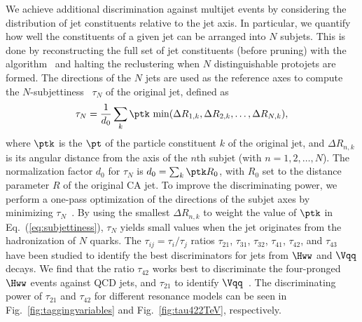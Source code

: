 We achieve additional discrimination against multijet events by
considering the distribution of jet constituents relative to the jet
axis. In particular, we quantify how well the constituents of a given
jet can be arranged into $N$ subjets. This is done by reconstructing
the full set of jet constituents (before pruning) with the \kt
algorithm~\cite{ktalg} and halting the reclustering when $N$
distinguishable protojets are formed.  
The directions of the $N$ jets are used as the reference axes to
compute the
$N$-subjettiness~\cite{Thaler:2010tr,Thaler:2011gf,Stewart:2010tn}
$\tau_{N}$ of the original jet, defined as
\begin{equation}
\label{eq:subjettiness}
\tau_N = \frac{1}{d_{0}} \sum_{k} \ptk\,\min( \Delta R_{1,k}, \Delta R_{2,k},\ldots,\Delta R_{N,k}),
\end{equation}
%
where $\ptk$ is the $\pt$ of the particle constituent $k$ of the
original jet, and $\Delta R_{n,k}$ is its angular distance from the
axis of the $n$th subjet (with $n=1, 2,\ldots,N$). The normalization
factor $d_{0}$ for $\tau_N$ is $d_{0}= \sum_{k} \ptk R_{0}$, with
$R_{0}$ set to the distance parameter $R$ of the original CA jet. To
improve the discriminating power, we perform a one-pass optimization
of the directions of the subjet axes by minimizing
$\tau_{N}$~\cite{Thaler:2011gf,JME-13-006}.  By using the smallest
$\Delta R_{n,k}$ to weight the value of $\ptk$ in
Eq.~(\ref{eq:subjettiness}), $\tau_N$ yields small values when the jet
originates from the hadronization of $N$ quarks. 
The $\tau_{ij} = \tau_{i} / \tau_{j}$
ratios $\tau_{21}$, $\tau_{31}$, 
$\tau_{32}$, $\tau_{41}$, $\tau_{42}$, and $\tau_{43}$ 
have been studied to identify
the best discriminators for jets from $\Hww$ and $\Vqq$ decays. 
We find that the ratio $\tau_{42}$
works best to discriminate the four-pronged $\Hww$ events against QCD jets,
 and $\tau_{21}$
to identify $\Vqq$~\cite{Khachatryan:2014hpa}.
The discriminating power of $\tau_{21}$  and $\tau_{42}$ for
different resonance models can be seen in
Fig.~\ref{fig:taggingvariables} and Fig.~\ref{fig:tau422TeV}, respectively. 



